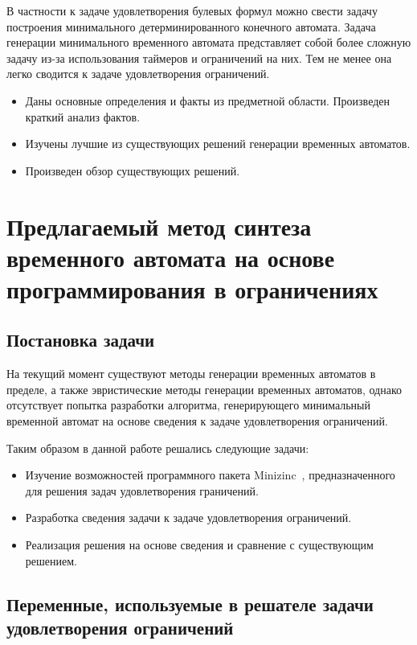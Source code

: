 \documentclass[times,specification,annotation]{itmo-student-thesis}
\begin{document}
В частности к задаче удовлетворения булевых формул можно свести задачу построения минимального детерминированного конечного автомата.
Задача генерации минимального временного автомата представляет собой более сложную задачу из-за использования таймеров и ограничений на них.
Тем не менее она легко сводится к задаче удовлетворения ограничений.

\finishrelatedwork

\chapterconclusion

\begin{itemize}
  \item Даны основные определения и факты из предметной области. Произведен краткий анализ фактов.
  \item Изучены лучшие из существующих решений генерации временных автоматов.
  \item Произведен обзор существующих решений.
\end{itemize}

\chapter{Предлагаемый метод синтеза временного автомата на основе программирования в ограничениях}

\section{Постановка задачи}

На текущий момент существуют методы генерации временных автоматов в пределе, а также эвристические методы генерации временных автоматов, 
однако отсутствует попытка разработки алгоритма, генерирующего минимальный временной автомат на основе сведения к задаче удовлетворения ограничений.

Таким образом в данной работе решались следующие задачи:

\begin{itemize}
  \item Изучение возможностей программного пакета Minizinc~\cite{minizinc}, предназначенного для решения задач удовлетворения граничений. 
  \item Разработка сведения задачи к задаче удовлетворения ограничений.
  \item Реализация решения на основе сведения и сравнение с существующим решением.
\end{itemize}

\section{Переменные, используемые в решателе задачи удовлетворения ограничений}
\end{document}
